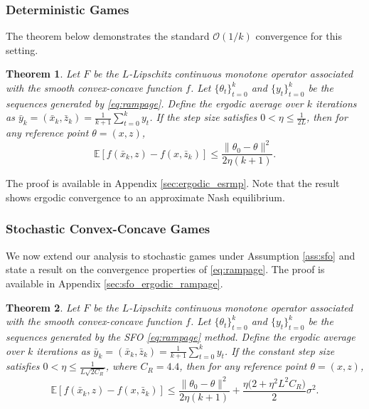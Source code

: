 \documentclass[letter,11pt]{article}
\newtheorem{theorem}{Theorem}[]
\begin{document}
\subsubsection{Deterministic Games}
The theorem below demonstrates the standard $\mathcal{O}(1/k)$ convergence for this setting.
\begin{theorem} \label{thm:ergodic_esrmp}
Let $F$ be the $L$-Lipschitz continuous monotone operator associated with the smooth convex-concave function $f$. Let $\{\theta_t\}_{t=0}^k$ and $\{y_t\}_{t=0}^k$ be the sequences generated by \eqref{eq:rampage}. Define the ergodic average over $k$ iterations as $\bar{y}_k = (\bar{x}_k, \bar{z}_k) = \frac{1}{k+1} \sum_{t=0}^k y_t$. If the step size satisfies $0 < \eta \le \frac{1}{2L}$, then for any reference point $\theta = (x, z)$,
\begin{equation}
\mathbb{E} \left[ f(\bar{x}_k, z) - f(x, \bar{z}_k) \right] \le \frac{\|\theta_0 - \theta\|^2}{2\eta (k+1)}.
\end{equation}
\end{theorem}
The proof is available in Appendix \ref{sec:ergodic_esrmp}. Note that the result shows ergodic convergence to an approximate Nash equilibrium.
\subsubsection{Stochastic Convex-Concave Games}
We now extend our analysis to stochastic games under Assumption \ref{ass:sfo} and state a result on the convergence properties of \eqref{eq:rampage}. The proof is available in Appendix \ref{sec:sfo_ergodic_rampage}. 
\begin{theorem} \label{thm:sfo_ergodic_rampage}
Let $F$ be the $L$-Lipschitz continuous monotone operator associated with the smooth convex-concave function $f$. Let $\{\theta_t\}_{t=0}^k$ and $\{y_t\}_{t=0}^k$ be the sequences generated by the SFO \eqref{eq:rampage} method. Define the ergodic average over $k$ iterations as $\bar{y}_k = (\bar{x}_k, \bar{z}_k) = \frac{1}{k+1} \sum_{t=0}^k y_t$. If the constant step size satisfies $0 < \eta \le \frac{1}{L \sqrt{2 C_R}}$, where $C_R = 4.4$, then for any reference point $\theta = (x, z)$,
\begin{equation}
\mathbb{E} \left[ f(\bar{x}_k, z) - f(x, \bar{z}_k) \right] \le \frac{\|\theta_0 - \theta\|^2}{2\eta (k+1)} + \frac{\eta \big(2 + \eta^2 L^2 C_R\big)}{2} \sigma^2.
\end{equation}
\end{theorem}
\end{document}
